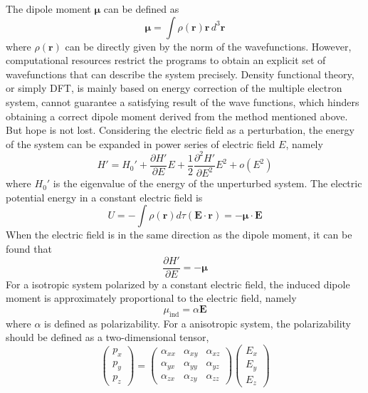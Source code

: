 \documentclass[%
 reprint,
 amsmath,amssymb,
 aps,
10.5pt,
]{revtex4-1}
\begin{document}
The dipole moment $\bm{\mu}$ can be defined as
\begin{equation}
  \bm{\mu} = \int \rho ( \mathbf { r } ) \mathbf { r } \, d ^ { 3 } \mathbf { r }
\end{equation}
where $\rho(\mathbf{r})$ can be directly given by the norm of the wavefunctions.
However, computational resources restrict the
programs to obtain an explicit set of wavefunctions that
can describe the system precisely. Density functional theory,
or simply DFT, is mainly based on energy correction
of the multiple electron system, cannot guarantee a
satisfying result of the wave functions, which hinders obtaining
a correct dipole moment derived from the method
mentioned above. But hope is not lost. Considering the electric field as a perturbation, the energy of the system can be expanded in power series of electric field $E$, namely
\begin{equation}
	H' = H_0' + \frac{\partial H'}{\partial E} E + \frac{1}{2} \frac{ \partial^2 H'}{\partial E^2} E^2 + o(E^2)
	\label{expand}
\end{equation}
where $H_0'$ is the eigenvalue of the energy of the unperturbed system. The electric potential energy in a constant electric field is
 \begin{equation}
 	U = - \int \rho(\mathbf{r})d \tau (\mathbf{E} \cdot \mathbf{r}) = - \bm{\mu} \cdot \mathbf{E}
\label{dipolepotential}
 \end{equation}
 When the electric field is in the same direction as the dipole moment, it can be found that 
 \begin{equation}
 	\frac{\partial H'}{\partial E} = - \bm{\mu}
 \end{equation}
 For a isotropic system polarized by a constant electric field, the induced dipole moment is approximately proportional to the electric field, namely
 \begin{equation}
 	\mu_\text{ind} = \alpha \mathbf{E}
 \end{equation}
 where $\alpha$ is defined as polarizability. For a anisotropic system, the polarizability should be defined as a two-dimensional tensor,
 \begin{equation}
  	\begin{pmatrix}
  	p_x \\
  	p_y \\
  	p_z
  	\end{pmatrix} =
  	\begin{pmatrix}
  	\alpha_{xx} & \alpha_{xy} & \alpha_{xz} \\
  	\alpha_{yx} & \alpha_{yy} & \alpha_{yz} \\
  	\alpha_{zx} & \alpha_{zy} & \alpha_{zz}
  	\end{pmatrix}
  	\begin{pmatrix}
  	E_x\\
  	E_y\\
  	E_z
  	\end{pmatrix}
  \end{equation} 
\end{document}
